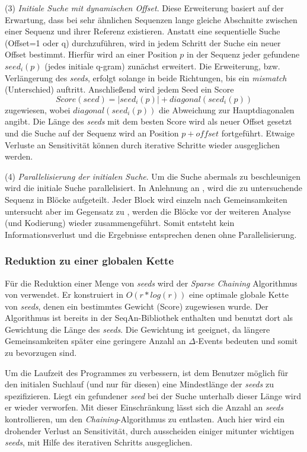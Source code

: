 \documentclass[12pt]{article}
\begin{document}
(3) \emph{Initiale Suche mit dynamischen Offset}. Diese Erweiterung basiert auf der Erwartung, dass bei sehr ähnlichen Sequenzen lange gleiche Abschnitte zwischen einer Sequenz und ihrer Referenz existieren. Anstatt eine sequentielle Suche (Offset=1 oder q) durchzuführen, wird in jedem Schritt der Suche ein neuer Offset bestimmt.  Hierfür wird an einer Position $p$ in der Sequenz jeder gefundene $seed_{i}(p)$ (jedes initiale q-gram) zunächst erweitert. Die Erweiterung, bzw. Verlängerung des \textit{seeds}, erfolgt solange in beide Richtungen, bis ein \textit{mismatch} (Unterschied) auftritt. Anschließend wird jedem Seed ein Score 
\begin{equation}
Score(seed)=|seed_{i}(p)|+diagonal(seed_{i}(p))
\end{equation}
zugewiesen, wobei $diagonal(seed_{i}(p))$ die Abweichung zur Hauptdiagonalen angibt. Die Länge des \textit{seeds} mit dem besten 
Score wird als neuer Offset gesetzt und die Suche auf der Sequenz wird an Position $p+offset$ fortgeführt. Etwaige Verluste an Sensitivität können durch iterative Schritte wieder ausgeglichen werden.

(4) \emph{Parallelisierung der initialen Suche}. Um die Suche abermals zu beschleunigen wird die initiale Suche parallelisiert. In Anlehnung an \cite{rani14new}, wird die zu untersuchende Sequenz in Blöcke aufgeteilt. Jeder Block wird einzeln nach Gemeinsamkeiten untersucht aber im Gegensatz zu \cite{rani14new}, werden die Blöcke vor der weiteren Analyse (und Kodierung) wieder zusammengeführt. Somit entsteht kein Informationsverlust und die Ergebnisse entsprechen denen ohne Parallelisierung.

\subsubsection{Reduktion zu einer globalen Kette}
Für die Reduktion einer Menge von \textit{seeds} wird der \textit{Sparse Chaining} Algorithmus von \cite{gusfield97algorithms} verwendet. Er konstruiert in $O(r*log(r))$ eine optimale globale Kette von \textit{seeds}, denen ein bestimmtes Gewicht (Score) zugewiesen wurde. Der Algorithmus ist bereits in der SeqAn-Bibliothek \cite{doering08seqan} enthalten und benutzt dort als Gewichtung die Länge des \textit{seeds}. Die Gewichtung ist geeignet, da längere Gemeinsamkeiten später eine geringere Anzahl an $\Delta$-Events bedeuten und somit zu bevorzugen sind.

Um die Laufzeit des Programmes zu verbessern, ist dem Benutzer möglich für den initialen Suchlauf (und nur für diesen) eine Mindestlänge der \textit{seeds} zu spezifizieren. Liegt ein gefundener \textit{seed} bei der Suche unterhalb dieser Länge wird er wieder verworfen. Mit dieser Einschränkung lässt sich die Anzahl an \textit{seeds} kontrollieren, um den \textit{Chaining}-Algorithmus zu entlasten. Auch hier wird ein drohender Verlust an Sensitivität, durch ausscheiden einiger mitunter wichtigen \textit{seeds}, mit Hilfe des iterativen Schritts ausgeglichen.
\end{document}

